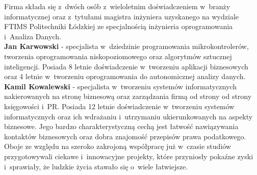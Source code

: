 \documentclass[../main.tex]{subfiles}
\begin{document}
 {
    Firma składa się z~dwóch osób z~wieloletnim doświadczeniem w~branży informatycznej
    oraz z~tytułami magistra inżyniera uzyskanego na wydziale FTIMS Politechniki
    Łódzkiej ze specjalnością inżynieria oprogramowania i~Analiza Danych.\\

    \noindent\textbf{Jan Karwowski} - specjalista w~dziedzinie programowania
    mikrokontrolerów, tworzenia oprogramowania niskopoziomowego oraz algorytmów
    sztucznej inteligencji. Posiada 8 letnie doświadczenie w~tworzeniu aplikacji
    biznesowych oraz 4 letnie w~tworzeniu oprogramowania do autonomicznej analizy
    danych.\\

    \noindent\textbf{Kamil Kowalewski} - specjalista w~tworzeniu systemów informatycznych
    nakierowanych na stronę biznesową oraz zarządzania firmą od strony od strony
    księgowości i~PR. Posiada 12 letnie doświadczenie w~tworzeniu systemów
    informatycznych oraz ich wdrażaniu i~utrzymaniu ukierunkowanych na aspekty biznesowe.
    Jego bardzo charakterystyczną cechą jest łatwość nawiązywania kontaktów biznesowych
    oraz dobra znajomość przepisów prawa podatkowego.\\

    Oboje ze względu na szeroko zakrojoną współpracę już w~czasie studiów
    przygotowywali ciekawe i~innowacyjne projekty, które przyniosły pokaźne zyski
    i~sprawiały, że ludzkie życia stawało się o~wiele łatwiejsze.
}
\end{document}
